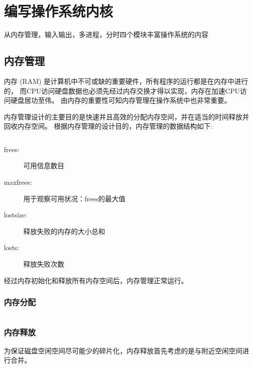 \chapter{编写操作系统内核}

从内存管理，输入输出，多进程，分时四个模块丰富操作系统的内容

\section{内存管理}

内存 (RAM) 是计算机中不可或缺的重要硬件，所有程序的运行都是在内存中进行的，
而CPU访问硬盘数据也必须先经过内存交换才得以实现，内存在加速CPU访问硬盘居功至伟。
由内存的重要性可知内存管理在操作系统中也非常重要。	

内存管理设计的主要目的是快速并且高效的分配内存空间，并在适当的时间释放并回收内存空间。
根据内存管理的设计目的，内存管理的数据结构如下:

\begin{listing}[H]
  \inputminted[tabsize=2, firstline=137, lastline=143,
  linenos=true]{c}{../ZOS/src/kernel/bootpack.h}
\end{listing}

\begin{description}
\item[frees:]可用信息数目
\item[maxfrees:]用于观察可用状况：frees的最大值
\item[lostsize:]释放失败的内存的大小总和
\item[losts:]释放失败次数
\end{description}

经过内存初始化和释放所有内存空间后，内存管理正常运行。

\subsection{内存分配}

\begin{listing}[H]
  \inputminted[tabsize=2, firstline=68, lastline=78,
  linenos=true]{c}{../ZOS/src/kernel/memory.c}
\end{listing}

\newpage
\subsection{内存释放}

为保证磁盘空闲空间尽可能少的碎片化，内存释放首先考虑的是与附近空闲空间进行合并。

